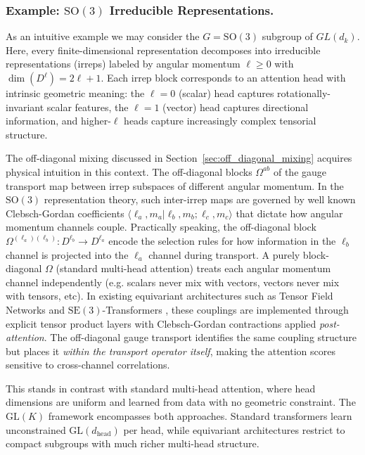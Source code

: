 \documentclass[twoside,11pt]{article}
\begin{document}
\subsubsection{Example: $\mathrm{SO}(3)$ Irreducible Representations.}

As an intuitive example we may consider the $G = \mathrm{SO}(3)$ subgroup of $GL(d_k)$. Here, every finite-dimensional representation decomposes into irreducible representations (irreps) labeled by angular momentum $\ell \geq 0$ with $\dim(D^\ell) = 2\ell + 1$. Each irrep block corresponds to an attention head with intrinsic geometric meaning: the $\ell = 0$ (scalar) head captures rotationally-invariant scalar features, the $\ell = 1$ (vector) head captures directional information, and higher-$\ell$ heads capture increasingly complex tensorial structure.

The off-diagonal mixing discussed in Section~\ref{sec:off_diagonal_mixing} acquires physical intuition in this context. The off-diagonal blocks $\Omega^{ab}$ of the gauge transport map between irrep subspaces of different angular momentum. In the $\mathrm{SO}(3)$ representation theory, such inter-irrep maps are governed by well known Clebsch-Gordan coefficients $\langle \ell_a, m_a | \ell_b, m_b; \ell_c, m_c \rangle$ that dictate how angular momentum channels couple. Practically speaking, the off-diagonal block $\Omega^{(\ell_a)(\ell_b)} : D^{\ell_b} \to D^{\ell_a}$ encode the selection rules for how information in the $\ell_b$ channel is projected into the $\ell_a$ channel during transport. A purely block-diagonal $\Omega$ (standard multi-head attention) treats each angular momentum channel independently (e.g. scalars never mix with vectors, vectors never mix with tensors, etc). In existing equivariant architectures such as Tensor Field Networks \citep{thomas2018tensor} and $\mathrm{SE}(3)$-Transformers \citep{fuchs2020se3}, these couplings are implemented through explicit tensor product layers with Clebsch-Gordan contractions applied \emph{post-attention}. The off-diagonal gauge transport identifies the same coupling structure but places it \emph{within the transport operator itself}, making the attention scores sensitive to cross-channel correlations.

This stands in contrast with standard multi-head attention, where head dimensions are uniform and learned from data with no geometric constraint. The $\mathrm{GL}(K)$ framework encompasses both approaches. Standard transformers learn unconstrained $\mathrm{GL}(d_{\text{head}})$ per head, while equivariant architectures restrict to compact subgroups with much richer multi-head structure.
\end{document}
